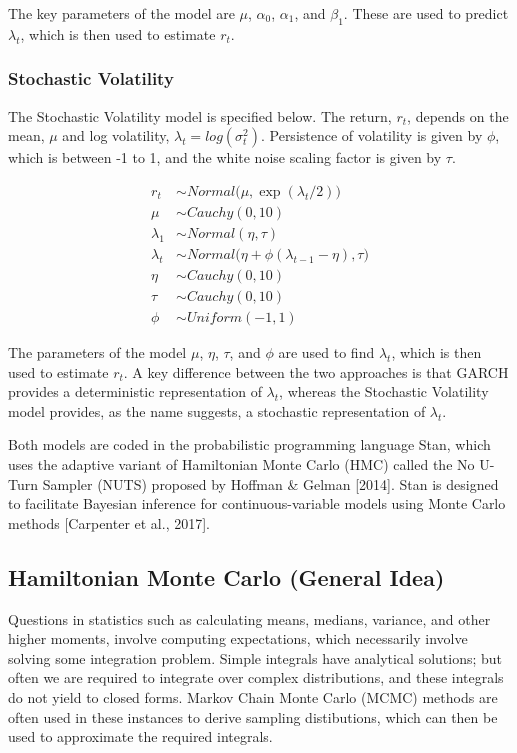\documentclass[12pt,letterpaper,reqno,fleqn]{article}
\begin{document}
The key parameters of the model are $\mu$, $\alpha_0$, $\alpha_1$, and $\beta_1$. These are used to predict $\lambda_t$, which is then used to estimate $r_t$. 

\subsubsection{Stochastic Volatility}
The Stochastic Volatility model is specified below. The return, $r_t$, depends on the mean, $\mu$ and log volatility, $\lambda_t = log(\sigma^2_t)$. Persistence of volatility is given by $\phi$, which is between -1 to 1, and the white noise scaling factor is given by $\tau$.

\begin{align}
r_t &\sim Normal\bigl(\mu, \exp({\lambda_t/2})\bigr) \\
\mu &\sim Cauchy(0, 10) \\
\lambda_1 &\sim Normal(\eta, \tau) \\
\lambda_t &\sim Normal\bigl(\eta + \phi(\lambda_{t-1} - \eta), \tau\bigr) \\
\eta &\sim Cauchy(0, 10) \\
\tau &\sim Cauchy(0, 10) \\
\phi &\sim Uniform(-1, 1)
\end{align}

The parameters of the model $\mu$, $\eta$, $\tau$, and $\phi$ are used to find $\lambda_t$, which is then used to estimate $r_t$. A key difference between the two approaches is that GARCH provides a deterministic representation of $\lambda_t$, whereas the Stochastic Volatility model provides, as the name suggests, a stochastic representation of $\lambda_t$.

Both models are coded in the probabilistic programming language Stan, which uses the adaptive variant of Hamiltonian Monte Carlo (HMC) called the No U-Turn Sampler (NUTS) proposed by Hoffman \& Gelman [2014]. Stan is designed to facilitate Bayesian inference for continuous-variable models using Monte Carlo methods [Carpenter et al., 2017].

\subsection{Hamiltonian Monte Carlo (General Idea)}
Questions in statistics such as calculating means, medians, variance, and other higher moments, involve computing expectations, which necessarily involve solving some integration problem. Simple integrals have analytical solutions; but often we are required to integrate over complex distributions, and these integrals do not yield to closed forms. Markov Chain Monte Carlo (MCMC) methods are often used in these instances to derive sampling distibutions, which can then be used to approximate the required integrals.
\end{document}
